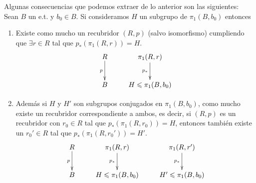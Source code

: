 \begin{observacion}
    Algunas consecuencias que podemos extraer de lo anterior son las siguientes:\\

    Sean $B$ un e.t. y $b_0\in B$. Si consideramos $H$ un subgrupo de $\pi_1(B,b_0)$ entonces
    \begin{enumerate}
        \item Existe como mucho un recubridor $(R,p)$ (salvo isomorfismo) cumpliendo que $\exists r\in R$ tal que $p_*(\pi_1(R,r)) = H$.
        \begin{gather*}
            \xymatrix{
                R \ar[d]_p & \pi_1(R,r)\ar[d]_{p_*}\\
                B & H \leq \pi_1(B,b_0)
            }
        \end{gather*}
        
        \item Además si $H$ y $H'$ son subgrupos conjugados en $\pi_1(B,b_0)$, como mucho existe un recubridor correspondiente a ambos, es decir, si $(R,p)$ es un recubridor con $r_0\in R$ tal que $p_*(\pi_1(R,r_0)) = H$, entonces también existe un $r_0'\in R$ tal que $p_*(\pi_1(R,r_0'))=H'$.
        \begin{gather*}
            \xymatrix{
                R \ar[d]_p & \pi_1(R,r)\ar[d]_{p_*} & \pi_1(R,r') \ar[d]_{p_*}\\
                B & H \leq \pi_1(B,b_0) & H'\leq \pi_1(B,b_0)
            }
        \end{gather*}
    \end{enumerate}
\end{observacion}

